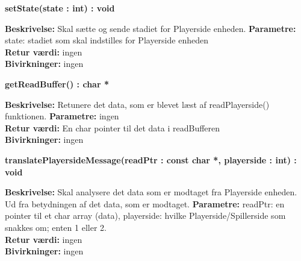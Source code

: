 \documentclass[Arkitektur/System_main.tex]{subfiles}
\begin{document}
\textbf{setState(state : int) : void}
\begin{adjustwidth}{1cm}{0pt}
\textbf{Beskrivelse:} Skal sætte og sende stadiet for Playerside enheden. 
\textbf{Parametre:} state: stadiet som skal indstilles for Playerside enheden \\[0.2cm]
\textbf{Retur værdi:} ingen  \\[0.2cm]
\textbf{Bivirkninger:} ingen \\[0.2cm]
\end{adjustwidth}

\textbf{getReadBuffer() : char *}
\begin{adjustwidth}{1cm}{0pt}
\textbf{Beskrivelse:} Retunere det data, som er blevet læst af readPlayerside() funktionen. 
\textbf{Parametre:} ingen \\[0.2cm]
\textbf{Retur værdi:} En char pointer til det data i readBufferen \\[0.2cm]
\textbf{Bivirkninger:} ingen \\[0.2cm]
\end{adjustwidth}

\textbf{translatePlayersideMessage(readPtr : const char *, playerside : int) : void}
\begin{adjustwidth}{1cm}{0pt}
\textbf{Beskrivelse:} Skal analysere det data som er modtaget fra Playerside enheden. Ud fra betydningen af det data, som er modtaget.
\textbf{Parametre:} readPtr: en pointer til et char array (data), playerside: hvilke Playerside/Spillerside som snakkes om; enten 1 eller 2. \\[0.2cm]
\textbf{Retur værdi:} ingen \\[0.2cm]
\textbf{Bivirkninger:} ingen \\[0.2cm]
\end{adjustwidth}
\end{document}

